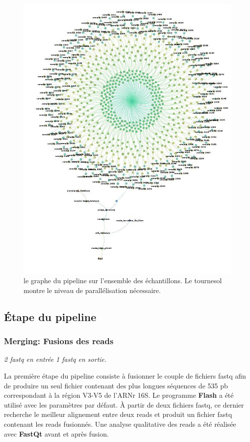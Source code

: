 \documentclass[12pt,a4paper]{article}
\begin{document}
\begin{figure}[ht]
\begin{center}
\includegraphics[scale=0.4]{img/dag.jpg}\hfill
\end{center}
\caption{le graphe du pipeline sur l'ensemble des échantillons. Le tournesol montre le niveau de parallélisation nécessaire.}
\label{dag}
\end{figure}

\subsection{Étape du pipeline}
\subsubsection{Merging: Fusions des reads}
\noindent\emph{ 2 fastq en entrée 1 fastq en sortie. }

La première étape du pipeline consiste à fusionner le couple de fichiers fastq afin de produire un seul fichier contenant des plus longues séquences de 535 pb correspondant à la région V3-V5 de l’ARNr 16S.
Le programme \textbf{Flash}\cite{Mago2011} a été utilisé avec les paramètres par défaut. À partir de deux fichiers fastq, ce dernier recherche le meilleur alignement entre deux reads et produit un fichier fastq contenant les reads fusionnés.
Une analyse qualitative des reads a été réalisée avec \textbf{FastQt}\citep{Labsquareteam2017} avant et après fusion.
\end{document}
